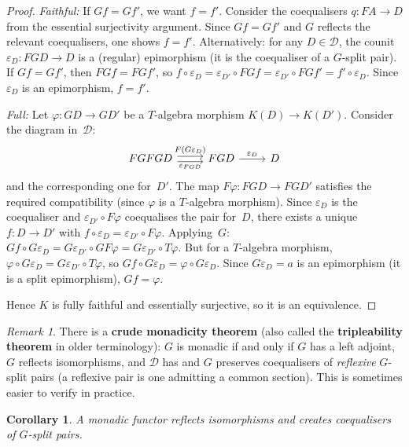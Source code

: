 \documentclass[a4paper,12pt]{book}
\theoremstyle{definition}
\theoremstyle{plain}
\newtheorem{corollary}[definition]{Corollary}
\theoremstyle{remark}
\newtheorem{remark}[definition]{Remark}
\begin{document}
\begin{proof}
\emph{Faithful:}
If $Gf = Gf'$, we want $f = f'$.  Consider the coequalisers
$q\colon FA\to D$ from the essential surjectivity argument.
Since $Gf = Gf'$ and $G$ reflects the relevant coequalisers, one
shows $f = f'$.  Alternatively: for any $D\in\mathcal{D}$,
the counit $\varepsilon_D\colon FGD\to D$ is a (regular) epimorphism
(it is the coequaliser of a $G$-split pair).
If $Gf = Gf'$, then $FGf = FGf'$, so
$f\circ\varepsilon_D = \varepsilon_{D'}\circ FGf
= \varepsilon_{D'}\circ FGf' = f'\circ\varepsilon_D$.
Since $\varepsilon_D$ is an epimorphism, $f = f'$.

\emph{Full:}
Let $\varphi\colon GD\to GD'$ be a $T$-algebra morphism
$K(D)\to K(D')$.  Consider the diagram in~$\mathcal{D}$:
\[
\begin{tikzcd}
FGFGD \arrow[r, shift left, "F(G\varepsilon_D)"]
       \arrow[r, shift right, "\varepsilon_{FGD}"'] &
FGD \arrow[r, "\varepsilon_D"] &
D
\end{tikzcd}
\]
and the corresponding one for~$D'$.  The map $F\varphi\colon FGD\to FGD'$
satisfies the required compatibility (since $\varphi$ is a $T$-algebra
morphism).  Since $\varepsilon_D$ is the coequaliser and
$\varepsilon_{D'}\circ F\varphi$ coequalises the pair for~$D$,
there exists a unique $f\colon D\to D'$ with
$f\circ\varepsilon_D = \varepsilon_{D'}\circ F\varphi$.
Applying~$G$: $Gf\circ G\varepsilon_D = G\varepsilon_{D'}\circ GF\varphi
= G\varepsilon_{D'}\circ T\varphi$.  But for a $T$-algebra morphism,
$\varphi\circ G\varepsilon_D = G\varepsilon_{D'}\circ T\varphi$, so
$Gf\circ G\varepsilon_D = \varphi\circ G\varepsilon_D$.
Since $G\varepsilon_D = a$ is an epimorphism (it is a split epimorphism),
$Gf = \varphi$.

Hence $K$ is fully faithful and essentially surjective, so it is an
equivalence.
\end{proof}

\begin{remark}\label{rem:beck-crude}
There is a \textbf{crude monadicity theorem} (also called the
\textbf{tripleability theorem} in older terminology): $G$ is monadic
if and only if $G$ has a left adjoint, $G$ reflects isomorphisms,
and $\mathcal{D}$ has and $G$ preserves coequalisers of
\emph{reflexive} $G$-split pairs (a reflexive pair is one admitting
a common section).  This is sometimes easier to verify in practice.
\end{remark}

\begin{corollary}\label{cor:monadic-reflects}
A monadic functor reflects isomorphisms and creates coequalisers of
$G$-split pairs.
\end{corollary}
\end{document}
